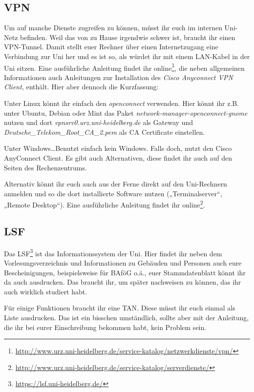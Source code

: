 \subsection*{VPN}
Um auf manche Dienste zugreifen zu können, müsst ihr euch im internen Uni-Netz befinden. Weil das von zu Hause irgendwie schwer ist, braucht ihr einen VPN-Tunnel. Damit stellt euer Rechner über einen Internetzugang eine Verbindung zur Uni her und es ist so, als würdet ihr mit einem LAN-Kabel in der Uni sitzen. Eine ausführliche Anleitung findet ihr online\footnote{\url{http://www.urz.uni-heidelberg.de/service-katalog/netzwerkdienste/vpn/}}, die neben allgemeinen Informationen auch Anleitungen zur Installation des \emph{Cisco Anyconnect VPN Client}, enthält. Hier aber dennoch die Kurzfassung:

Unter Linux könnt ihr einfach den \emph{openconnect} verwenden. Hier könnt ihr z.B. unter Ubuntu, Debian oder Mint das Paket \emph{network-manager-openconnect-gnome} nutzen und dort \emph{vpnsrv0.urz.uni-heidelberg.de} als Gateway und \emph{Deutsche\_Telekom\_Root\_CA\_2.pem} als CA Certificate einstellen.

Unter Windows\ldots Benutzt einfach kein Windows. Falls doch, nutzt den Cisco AnyConnect Client. Es gibt auch Alternativen, diese findet ihr auch auf den Seiten des Rechenzentrums.

Alternativ könnt ihr euch auch aus der Ferne direkt auf den Uni-Rechnern anmelden und so die dort installierte Software nutzen („Terminalserver“, „Remote Desktop“). Eine ausführliche Anleitung findet ihr online\footnote{\url{http://www.urz.uni-heidelberg.de/service-katalog/serverdienste/}}.

\subsection*{LSF}
Das LSF\footnote{\url{https://lsf.uni-heidelberg.de/}} ist das
Informationssystem der Uni. Hier findet ihr neben dem Vorlesungsverzeichnis und
Informationen zu Gebäuden und Personen auch eure Bescheinigungen,
beispielsweise für BAföG o.ä., euer Stammdatenblatt könnt ihr da auch
ausdrucken. Das braucht ihr, um später nachweisen zu können, das ihr auch
wirklich studiert habt.

Für einige Funktionen braucht ihr eine TAN. Diese müsst ihr euch einmal als
Liste ausdrucken. Das ist ein bisschen umständlich, sollte aber mit der
Anleitung, die ihr bei eurer Einschreibung bekommen habt, kein Problem sein.

